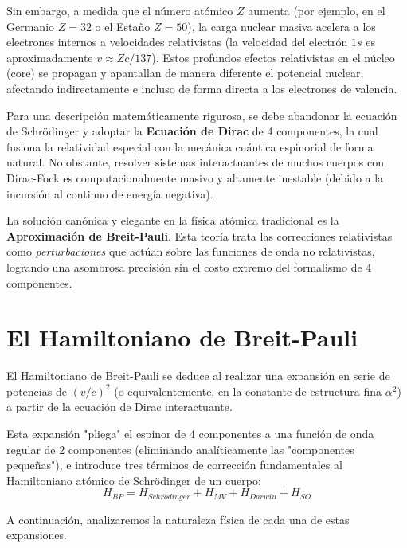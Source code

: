 \documentclass[11pt,a4paper]{article}
\begin{document}
Sin embargo, a medida que el número atómico $Z$ aumenta (por ejemplo, en el Germanio $Z=32$ o el Estaño $Z=50$), la carga nuclear masiva acelera a los electrones internos a velocidades relativistas (la velocidad del electrón $1s$ es aproximadamente $v \approx Zc/137$). Estos profundos efectos relativistas en el núcleo (core) se propagan y apantallan de manera diferente el potencial nuclear, afectando indirectamente e incluso de forma directa a los electrones de valencia.

Para una descripción matemáticamente rigurosa, se debe abandonar la ecuación de Schrödinger y adoptar la \textbf{Ecuación de Dirac} de 4 componentes, la cual fusiona la relatividad especial con la mecánica cuántica espinorial de forma natural. No obstante, resolver sistemas interactuantes de muchos cuerpos con Dirac-Fock es computacionalmente masivo y altamente inestable (debido a la incursión al continuo de energía negativa). 

La solución canónica y elegante en la física atómica tradicional es la \textbf{Aproximación de Breit-Pauli}. Esta teoría trata las correcciones relativistas como \textit{perturbaciones} que actúan sobre las funciones de onda no relativistas, logrando una asombrosa precisión sin el costo extremo del formalismo de 4 componentes.

\section{El Hamiltoniano de Breit-Pauli}
El Hamiltoniano de Breit-Pauli se deduce al realizar una expansión en serie de potencias de $(v/c)^2$ (o equivalentemente, en la constante de estructura fina $\alpha^2$) a partir de la ecuación de Dirac interactuante. 

Esta expansión "pliega" el espinor de 4 componentes a una función de onda regular de 2 componentes (eliminando analíticamente las "componentes pequeñas"), e introduce tres términos de corrección fundamentales al Hamiltoniano atómico de Schrödinger de un cuerpo:
\begin{equation}
H_{BP} = H_{Schr\ddot{o}dinger} + H_{MV} + H_{Darwin} + H_{SO}
\end{equation}

A continuación, analizaremos la naturaleza física de cada una de estas expansiones.
\end{document}
